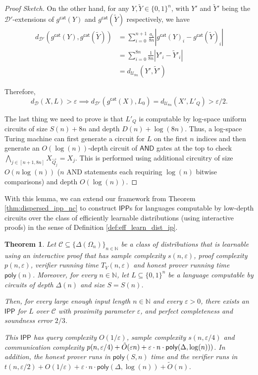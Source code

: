 \documentclass[11pt]{article}
\newtheorem{theorem}{Theorem}[section]
\newcommand{\poly}{\mathsf{poly}}
\newcommand{\IPP}{\mathsf{IPP}}
\newcommand{\N}{\mathbb{N}}
\newcommand{\sU}{\mathcal{U}}
\newcommand{\sD}{\mathcal{D}}
\begin{document}
\begin{proof}[Proof Sketch]
On the other hand, for any $Y,\widetilde{Y} \in \{0,1\}^{n}$, with $Y'$ and $\widetilde{Y}'$ being the $\sD'$-extensions of $g^{\mathsf{cat}}(Y)$  and $g^{\mathsf{cat}}(\widetilde{Y})$ respectively, we have 
\[
\begin{split}
    d_{\sD'}(g^{\mathsf{cat}}(Y),g^{\mathsf{cat}}(\widetilde{Y}))&=\sum_{i=0}^{n+1}\frac{a_{i}}{8n}|g^{\mathsf{cat}}(Y)_{i}-g^{\mathsf{cat}}(\widetilde{Y})_{i}|\\
    &=\sum_{i=0}^{8n}\frac{1}{8n}|Y'_{i}-\widetilde{Y}'_{i}|\\
    &=d_{\sU_{8n}}(Y',\widetilde{Y}')
\end{split}
\]

\noindent Therefore,
\begin{equation*}
    d_{\sD}(X,L)>\varepsilon\implies d_{\sD'}(g^{\mathsf{cat}}(X),L_{0})=d_{\sU_{8n}}(X',L'_Q)>\varepsilon/2.
\end{equation*}

The last thing we need to prove is that $L'_Q$ is computable by log-space uniform circuits of size $S(n)+8n$ and depth $D(n)+\log(8n)$. 
Thus, a log-space Turing machine can first generate a circuit for $L$ on the first $n$ indices and then generate an $O(\log (n))$-depth circuit of $\mathsf{AND}$ gates at the top to check $\bigwedge_{j\in[n+1,8n]}X_{\vec{Q}_{j}}=X_{j}$. This is performed using additional circuitry of size $O(n\log (n))$ ($n$ AND statements each requiring $\log (n)$ bitwise comparisons) and depth $O(\log (n))$. 
\end{proof}

With this lemma, we can extend our framework from Theorem \ref{thm:dispersed_ipp_nc} to construct $\IPP$s for languages computable by low-depth circuits over the class of efficiently learnable distributions (using interactive proofs) in the sense of Definition \ref{def:eff_learn_dist_ip}.
\begin{theorem}
\label{thm:dfIPPLearnable}
    Let $\mathcal{C}\subseteq \{\Delta(\Omega_n)\}_{n \in \mathbb{N}}$ be a class of distributions that is learnable using an interactive proof that has sample complexity $s(n,\varepsilon)$, proof complexity $p(n,\varepsilon)$, verifier running time $T_V(n,\varepsilon)$ and honest prover running time $\poly(n)$. Moreover, for every $n \in \N$, let $L \subseteq \{0,1\}^{n}$ be a language computable by circuits of depth $\Delta(n)$ and size $S=S(n)$.

    Then, for every large enough input length $n \in \N$ and every $\varepsilon > 0$, there exists an $\IPP$ for $L$ over $\mathcal{C}$ with proximity parameter $\varepsilon$, and perfect completeness and soundness error $2/3$.
    
    This $\IPP$ has query complexity $O(1/\varepsilon)$, sample complexity $s(n,\varepsilon/4)$ and communication complexity $p(n,\varepsilon/4)+\Tilde{O}(\varepsilon n)+\varepsilon\cdot n\cdot \poly(\Delta,\log(n)))$. In addition, the honest prover runs in $\poly(S,n)$ time and the verifier runs in $t(n,\varepsilon/2)+O(1/\varepsilon)+\varepsilon\cdot n\cdot \poly(\Delta,\log(n))+\tilde{O}(n)$.
\end{theorem}
\end{document}
